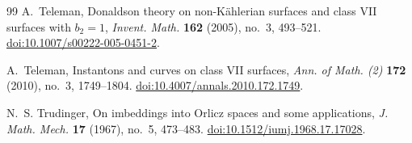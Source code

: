\begin{thebibliography}{99}
A.~Teleman, Donaldson theory on non-K\"ahlerian surfaces and class VII
surfaces with $b_2=1$, \emph{Invent. Math.} \textbf{162} (2005), no.~3,
493--521.
\href{https://doi.org/10.1007/s00222-005-0451-2}{doi:10.1007/s00222-005-0451-2}.

A.~Teleman, Instantons and curves on class VII surfaces,
\emph{Ann. of Math. (2)} \textbf{172} (2010), no.~3, 1749--1804.
\href{https://doi.org/10.4007/annals.2010.172.1749}{doi:10.4007/annals.2010.172.1749}.

N.~S. Trudinger, On imbeddings into Orlicz spaces and some applications,
\emph{J. Math. Mech.} \textbf{17} (1967), no.~5, 473--483.
\href{https://doi.org/10.1512/iumj.1968.17.17028}{doi:10.1512/iumj.1968.17.17028}.

\end{thebibliography}
